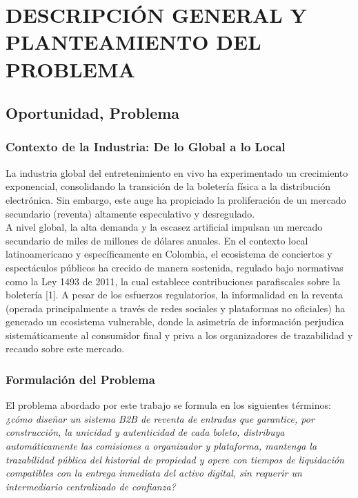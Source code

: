 \newpage
\section{DESCRIPCIÓN GENERAL Y PLANTEAMIENTO DEL PROBLEMA}

\subsection{Oportunidad, Problema}

\subsubsection{Contexto de la Industria: De lo Global a lo Local}

La industria global del entretenimiento en vivo ha experimentado un crecimiento exponencial, consolidando la transición de la boletería física a la distribución electrónica. Sin embargo, este auge ha propiciado la proliferación de un mercado secundario (reventa) altamente especulativo y desregulado. \\
A nivel global, la alta demanda y la escasez artificial impulsan un mercado secundario de miles de millones de dólares anuales. En el contexto local latinoamericano y específicamente en Colombia, el ecosistema de conciertos y espectáculos públicos ha crecido de manera sostenida, regulado bajo normativas como la Ley 1493 de 2011, la cual establece contribuciones parafiscales sobre la boletería [1]. A pesar de los esfuerzos regulatorios, la informalidad en la reventa (operada principalmente a través de redes sociales y plataformas no oficiales) ha generado un ecosistema vulnerable, donde la asimetría de información perjudica sistemáticamente al consumidor final y priva a los organizadores de trazabilidad y recaudo sobre este mercado.


\subsubsection{Formulación del Problema}

El problema abordado por este trabajo se formula en los siguientes términos: \textit{¿cómo diseñar un sistema B2B de reventa de entradas que garantice, por construcción, la unicidad y autenticidad de cada boleto, distribuya automáticamente las comisiones a organizador y plataforma, mantenga la trazabilidad pública del historial de propiedad y opere con tiempos de liquidación compatibles con la entrega inmediata del activo digital, sin requerir un intermediario centralizado de confianza?}

